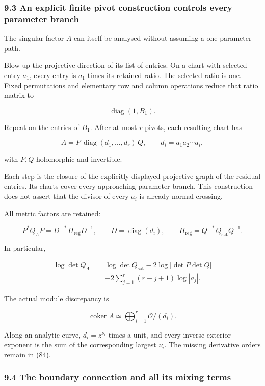 \documentclass[11pt]{article}
\begin{document}
\subsubsection{9.3 An explicit finite pivot construction controls every parameter branch}\label{an-explicit-finite-pivot-construction-controls-every-parameter-branch}

The singular factor \(A\) can itself be analysed without assuming a one-parameter path.

Blow up the projective direction of its list of entries. On a chart with selected entry \(a_1\), every entry is \(a_1\) times its retained ratio. The selected ratio is one. Fixed permutations and elementary row and column operations reduce that ratio matrix to

\[
\operatorname{diag}(1,B_1).
\]

Repeat on the entries of \(B_1\). After at most \(r\) pivots, each resulting chart has

\[
\boxed{
A=P\,\operatorname{diag}(d_1,\ldots,d_r)\,Q,
\qquad
d_i=a_1a_2\cdots a_i,
}
\tag{81}
\]

with \(P,Q\) holomorphic and invertible.

Each step is the closure of the explicitly displayed projective graph of the residual entries. Its charts cover every approaching parameter branch. This construction does not assert that the divisor of every \(a_i\) is already normal crossing.

All metric factors are retained:

\[
\boxed{
P^*Q_\Lambda P
=
D^{-*}H_{\mathrm{reg}}D^{-1},
\qquad
D=\operatorname{diag}(d_i),
\qquad
H_{\mathrm{reg}}=Q^{-*}Q_{\mathrm{sat}}Q^{-1}.
}
\tag{82}
\]

In particular,

\[
\boxed{
\begin{aligned}
\log\det Q_\Lambda
={}&
\log\det Q_{\mathrm{sat}}
-2\log|\det P\det Q|\\
&-2\sum_{j=1}^r(r-j+1)\log|a_j|.
\end{aligned}}
\tag{83}
\]

The actual module discrepancy is

\[
\boxed{
\operatorname{coker}A
\simeq\bigoplus_{i=1}^r\mathcal O/(d_i).
}
\tag{84}
\]

Along an analytic curve, \(d_i=z^{\nu_i}\) times a unit, and every inverse-exterior exponent is the sum of the corresponding largest \(\nu_i\). The missing derivative orders remain in (84).

\subsubsection{9.4 The boundary connection and all its mixing terms}\label{the-boundary-connection-and-all-its-mixing-terms}
\end{document}
